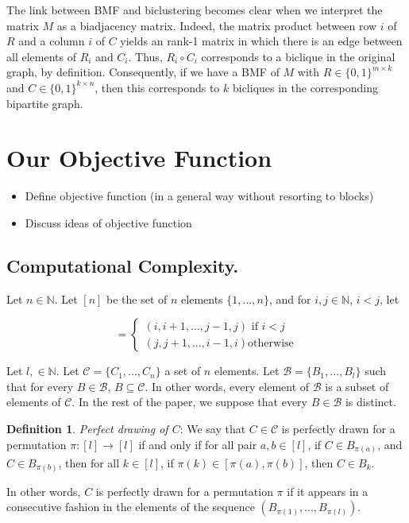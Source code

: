 \documentclass[twoside,leqno,twocolumn]{article}
\theoremstyle{definition}
\newtheorem{definition}{Definition}[section]
\begin{document}
\medskip

\noindent The link between BMF and biclustering becomes clear when we interpret the matrix $M$ as a biadjacency matrix. Indeed, the matrix product between row $i$ of $R$ and a column $i$ of $C$ yields an rank-1 matrix in which there is an edge between all elements of $R_i$ and $C_i$. Thus, $R_i \circ C_i$ corresponds to a biclique in the original graph, by definition. Consequently, if we have a BMF of $M$ with $R \in \{0,1\}^{m \times k}$ and $C \in \{0,1\}^{k \times n}$, then this corresponds to $k$ bicliques in the corresponding bipartite graph.


\section{Our Objective Function}

\begin{itemize}
	\item Define objective function (in a general way without resorting to blocks)
	\item Discuss ideas of objective function
\end{itemize}

\subsection{Computational Complexity.}

\noindent Let $n \in \mathbb{N}$. Let $[n]$ be the set of $n$ elements $\{1,...,n\}$, and for $i,j \in \mathbb{N}$, $i<j$, let

\begin{equation*}
    [i,j] =\begin{cases}
    (i,i+1,...,j-1,j) \text{ if } i<j\\
    (j,j+1,...,i-1,i) \text{otherwise}
    \end{cases}
\end{equation*}

\medskip


\noindent Let $l, \in \mathbb{N}$. Let $\mathcal{C} = \{C_1,...,C_n\}$ a set of $n$ elements. Let $\mathcal{B} = \{B_1,...,B_{l}\}$ such that for every $B \in \mathcal{B}$, $B\subseteq \mathcal{C}$. In other words, every element of $\mathcal{B}$ is a subset of elements of $\mathcal{C}$. In the rest of the paper, we suppose that every $B\in\mathcal{B}$ is distinct.

\begin{definition}
\textit{Perfect drawing of $C$}: \newline
We say that $C \in \mathcal{C}$ is perfectly drawn for a permutation $\pi:[l]\xrightarrow[]{} [l]$ if and only if for all pair $a,b \in [l]$, if $C \in B_{\pi(a)}$, and $C \in B_{\pi(b)}$, then for all $k \in [l]$, if $\pi(k) \in [\pi(a),\pi(b)] $, then $C \in B_k$.
\end{definition}
\noindent In other words, $C$ is perfectly drawn for a permutation $\pi$ if it appears in a consecutive fashion in the elements of the sequence $(B_{\pi(1)},...,B_{\pi(l)})$. 
\end{document}
